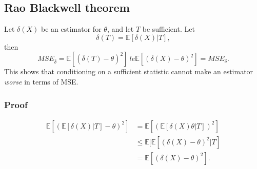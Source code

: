 \documentclass[titlepage, 12pt, leqno]{article}
\begin{document}
\subsection{Rao Blackwell theorem}
Let $\delta(X)$ be an estimator for $\theta$, and let $T$ be sufficient. Let
\[
    \delta(T) = \mathbb{E}[\delta(X)|T],
\]
then
\[
    MSE_{\bar \delta} = \mathbb{E}[(\bar \delta(T)-\theta)^{2}] \
    le \mathbb{E}[(\delta(X) - \theta)^{2}] = MSE_{\delta}.
\]
This shows that conditioning on a sufficient statistic cannot make an estimator
\textit{worse} in terms of MSE.
\subsubsection{Proof}
\begin{align*}
    \mathbb{E}[(\mathbb{E}[\delta(X)|T] - \theta)^{2}] &= \mathbb{E}[(
    \mathbb{E}[\delta(X)\theta|T])^{2}] \\
           &\le \mathbb{E}[\mathbb{E}[(\delta(X) - \theta)^{2}|T] \\
           &= \mathbb{E}[(\delta(X) - \theta)^{2}].
\end{align*}
\end{document}
